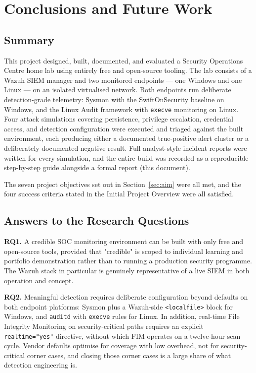 \section{Conclusions and Future Work}
\label{sec:conclusions}

\subsection{Summary}

This project designed, built, documented, and evaluated a Security
Operations Centre home lab using entirely free and open-source tooling.
The lab consists of a Wazuh SIEM manager and two monitored endpoints ---
one Windows and one Linux --- on an isolated virtualised network. Both
endpoints run deliberate detection-grade telemetry: Sysmon with the
SwiftOnSecurity baseline on Windows, and the Linux Audit framework with
\texttt{execve} monitoring on Linux. Four attack simulations covering
persistence, privilege escalation, credential access, and detection
configuration were executed and triaged against the built environment,
each producing either a documented true-positive alert cluster or a
deliberately documented negative result. Full analyst-style incident
reports were written for every simulation, and the entire build was
recorded as a reproducible step-by-step guide alongside a formal report
(this document).

The seven project objectives set out in Section~\ref{sec:aim} were all
met, and the four success criteria stated in the Initial Project Overview
were all satisfied.

\subsection{Answers to the Research Questions}

\textbf{RQ1.} A credible SOC monitoring environment can be built with only
free and open-source tools, provided that "credible" is scoped to
individual learning and portfolio demonstration rather than to running a
production security programme. The Wazuh stack in particular is genuinely
representative of a live SIEM in both operation and concept.

\textbf{RQ2.} Meaningful detection requires deliberate configuration
beyond defaults on both endpoint platforms: Sysmon plus a Wazuh-side
\texttt{<localfile>} block for Windows, and \texttt{auditd} with
\texttt{execve} rules for Linux. In addition, real-time File Integrity
Monitoring on security-critical paths requires an explicit
\texttt{realtime="yes"} directive, without which FIM operates on a
twelve-hour scan cycle. Vendor defaults optimise for coverage with low
overhead, not for security-critical corner cases, and closing those
corner cases is a large share of what detection engineering is.

